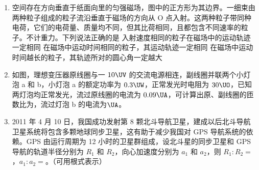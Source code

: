 \documentclass[\gkver]{gaokaozhenti}
\begin{document}
\begin{enumerate}

\item
空间存在方向垂直于纸面向里的匀强磁场，图中的正方形为其边界。一细束由两种粒子组成的粒子流沿垂直于磁场的方向从 O 点入射。这两种粒子带同种电荷，它们的电荷量、质量均不同，但其比荷相同，且都包含不同速率的粒子。不计重力。下列说法正确的是
{入射速度相同的粒子在磁场中的运动轨迹一定相同}
{在磁场中运动时间相同的粒子，其运动轨迹一定相同}
{在磁场中运动时间越长的粒子，其轨迹所对的圆心角一定越大}


\item
如图，理想变压器原线圈与一 $10\UV$ 的交流电源相连，副线圈并联两个小灯泡 a 和 b，小灯泡 a 的额定功率为 $0.3\UW$，正常发光时电阻为 $30\UO$，已知两灯泡均正常发光，流过原线圈的电流为 $0.09\UA$，可计算出原、副线圈的匝数比为，流过灯泡 b 的电流为$\UA$。


\item
2011 年 4 月 10 日，我国成功发射第 8 颗北斗导航卫星，建成以后北斗导航卫星系统将包含多颗地球同步卫星，这有助于减少我国对 GPS 导航系统的依赖。GPS 由运行周期为 12 小时的卫星群组成，设北斗星的同步卫星和 GPS 导航的轨道半径分别为 $R_{1}$ 和 $R_{2}$，向心加速度分别为 $a_{1}$ 和 $a_{2}$，则 $R_{1}:R_{2}=$，$a_{1}:a_{2}=$。（可用根式表示）


\end{enumerate}
\end{document}
